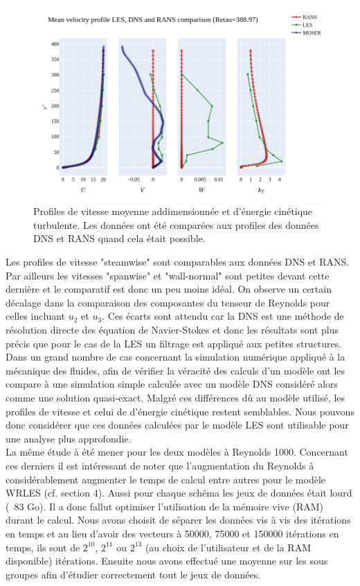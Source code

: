 \documentclass[12pt]{article}
\theoremstyle{plain}
\theoremstyle{remark}
\begin{document}
\begin{figure}[H]
	\begin{center}
		\includegraphics[width=0.8\linewidth]{../../output/figures/channel_wrles_retau395/split_time/RANS/RANS_LES_MOSER_profiles_all.png}
		\caption{Profiles de vitesse moyenne addimensionnée et d'énergie cinétique turbulente. Les données ont été comparées aux profiles des données DNS et RANS quand cela était possible.}
		\label{fig:mean-vel}
	\end{center}
\end{figure}

Les profiles de vitesse "steamwise" sont comparables aux données DNS et RANS. Par ailleurs les vitesses "spanwise" et "wall-normal" sont petites devant cette dernière et le comparatif est donc un peu moins idéal. On observe un certain décalage dans la comparaison des composantes du tenseur de Reynolds pour celles incluant $u_2$ et $u_3$. Ces écarts sont attendu car la DNS est une méthode de résolution directe des équation de Navier-Stokes et donc les résultats sont plus précis que pour le cas de la LES un filtrage est appliqué aux petites structures. Dans un grand nombre de cas concernant la simulation numérique appliqué à la mécanique des fluides, afin de vérifier la véracité des calculs d'un modèle ont les compare à une simulation simple calculée avec un modèle DNS considéré alors comme une solution quasi-exact. Malgré ces différences dû au modèle utilisé, les profiles de vitesse et celui de d'énergie cinétique restent semblables. Nous pouvons donc considérer que ces données calculées par le modèle LES sont utilisable pour une analyse plus approfondie. \\

La même étude à été mener pour les deux modèles à Reynolds 1000. Concernant ces derniers il est intéressant de noter que l'augmentation du Reynolds à considérablement augmenter le temps de calcul entre autres pour le modèle WRLES (cf. section 4). Aussi pour chaque schéma les jeux de données était lourd (~83 Go). Il a donc fallut optimiser l'utilisation de la mémoire vive (RAM) durant le calcul. Nous avons choisit de séparer les données vis à vis des itérations en temps et au lieu d'avoir des vecteurs à 50000, 75000 et 150000 itérations en temps, ils sont de $2^10$, $2^11$ ou $2^13$ (au choix de l'utilisateur et de la RAM disponible) itérations. Ensuite nous avons effectué une moyenne sur les sous groupes afin d'étudier correctement tout le jeux de données.\\
\end{document}
